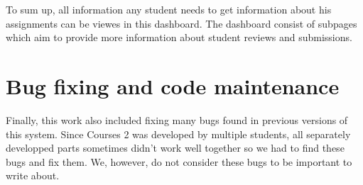 To sum up, all information any student needs to get information about his assignments can be viewes in this dashboard. The dashboard consist of subpages which aim to provide more information about student reviews and submissions. 

\section{Bug fixing and code maintenance}
Finally, this work also included fixing many bugs found in previous versions of this system. Since Courses 2 was developed by multiple students, all separately developped parts sometimes didn't work well together so we had to find these bugs and fix them. We, however, do not consider these bugs to be important to write about.

